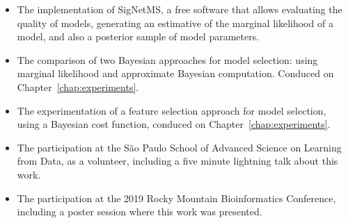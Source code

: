 \begin{itemize}
\item{The implementation of SigNetMS, a free software that allows
    evaluating the quality of models, generating an estimative of the
    marginal likelihood of a model, and also a posterior sample of model
    parameters.}
\item{The comparison of two Bayesian approaches for model selection:
    using marginal likelihood and approximate Bayesian computation.
    Conduced on Chapter~\ref{chap:experiments}.}
\item{The experimentation of a feature selection approach for model
    selection, using a Bayesian cost function, conduced on
    Chapter~\ref{chap:experiments}.}
\item{The participation at the São Paulo School of Advanced Science on 
    Learning from Data, as a volunteer, including a five minute
    lightning talk about this work.}
\item{The participation at the 2019 Rocky Mountain Bioinformatics 
    Conference, including a poster session where this work was
    presented.}
\end{itemize}


